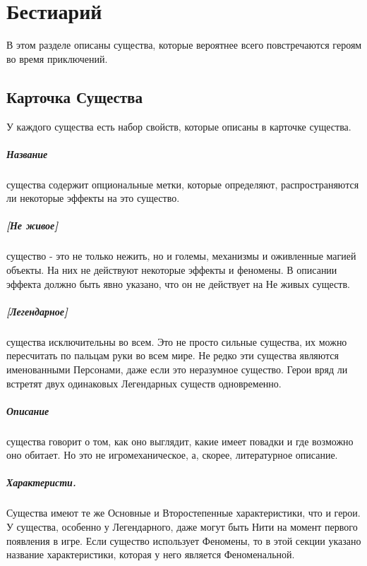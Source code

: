 \chapter{Бестиарий}
В этом разделе описаны существа, которые вероятнее всего повстречаются героям во время приключений.
\section{Карточка Существа}
У каждого существа есть набор свойств, которые описаны в карточке существа.
\paragraph{Название} существа содержит опциональные метки, которые определяют, распространяются ли некоторые эффекты на это существо.
\paragraph{[Не живое]} существо - это не только нежить, но и големы, механизмы и оживленные магией объекты. На них не действуют некоторые эффекты и феномены. В описании эффекта должно быть явно указано, что он не действует на Не живых существ.
\paragraph{[Легендарное]} существа исключительны во всем. Это не просто сильные существа, их можно пересчитать по пальцам руки во всем мире. Не редко эти существа являются именованными Персонами, даже если это неразумное существо. Герои вряд ли встретят двух одинаковых Легендарных существ одновременно.
\paragraph{Описание} существа говорит о том, как оно выглядит, какие имеет повадки и где возможно оно обитает. Но это не игромеханическое, а, скорее, литературное описание.
\paragraph{Характеристи.} Существа имеют те же Основные и Второстепенные характеристики, что и герои. У существа, особенно у Легендарного, даже могут быть Нити на момент первого появления в игре. Если существо использует Феномены, то в этой секции указано название характеристики, которая у него является Феноменальной.
